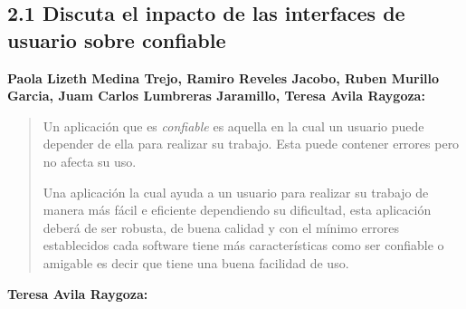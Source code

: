 
\subsection*{2.1 Discuta el inpacto de las interfaces de usuario sobre confiable}

\textbf{Paola Lizeth Medina Trejo, Ramiro Reveles Jacobo, Ruben Murillo Garcia, Juam Carlos Lumbreras Jaramillo, Teresa Avila Raygoza:}

\begin{quote}
  Un aplicación que es \textit{confiable} es aquella en la cual
un usuario puede depender de ella para realizar su trabajo. Esta
puede contener errores pero no afecta su uso.

Una aplicación la cual ayuda a un usuario para realizar su trabajo de manera más fácil e eficiente dependiendo su dificultad, esta aplicación deberá de ser robusta, de buena calidad y con el mínimo errores establecidos cada software tiene más características como ser confiable o amigable es decir que tiene una buena facilidad de uso.
\end{quote}

\textbf{Teresa Avila Raygoza:}


